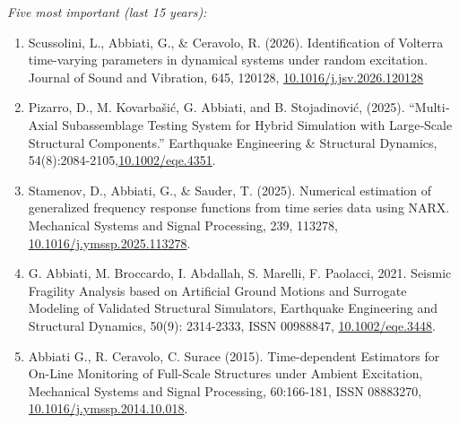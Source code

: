 \documentclass[12pt,a4paper]{article}
\begin{document}
\noindent\textit{Five most important (last 15 years):}
\begin{enumerate}%
  \item Scussolini, L., Abbiati, G., \& Ceravolo, R. (2026). Identification of Volterra time-varying parameters in dynamical systems under random excitation. Journal of Sound and Vibration, 645, 120128, \url{10.1016/j.jsv.2026.120128}
  \item Pizarro, D., M. Kovarbašić, G. Abbiati, and B. Stojadinović, (2025). “Multi‐Axial Subassemblage Testing System for Hybrid Simulation with Large‐Scale Structural Components.” Earthquake Engineering \& Structural Dynamics, 54(8):2084-2105,\url{10.1002/eqe.4351}.
  \item Stamenov, D., Abbiati, G., \& Sauder, T. (2025). Numerical estimation of generalized frequency response functions from time series data using NARX. Mechanical Systems and Signal Processing, 239, 113278, \url{10.1016/j.ymssp.2025.113278}. 
  \item G. Abbiati, M. Broccardo, I. Abdallah, S. Marelli, F. Paolacci, 2021. Seismic Fragility Analysis based on Artificial Ground Motions and Surrogate Modeling of Validated Structural Simulators, Earthquake Engineering and Structural Dynamics, 50(9): 2314-2333, ISSN 00988847, \url{10.1002/eqe.3448}.
  \item Abbiati G., R. Ceravolo, C. Surace (2015). Time-dependent Estimators for On-Line Monitoring of Full-Scale Structures under Ambient Excitation, Mechanical Systems and Signal Processing, 60:166-181, ISSN 08883270, \url{10.1016/j.ymssp.2014.10.018}.
\end{enumerate}
\end{document}
